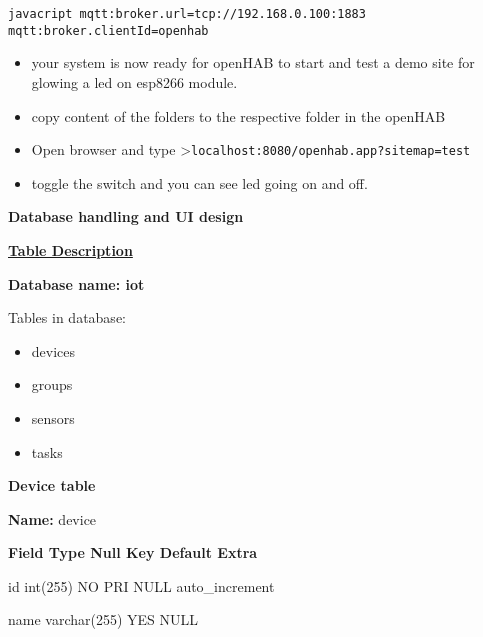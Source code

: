 \documentclass[16pt]{article}
\begin{document}
\texttt{javacript       mqtt:broker.url=tcp://192.168.0.100:1883       mqtt:broker.clientId=openhab}

\begin{itemize}


\item your system is now ready for openHAB to start and test a demo site for
glowing a led on esp8266 module.
\item copy content of the folders to the
respective folder in the openHAB 
\item Open browser and type
\textgreater{}\texttt{localhost:8080/openhab.app?sitemap=test}
\item toggle
the switch and you can see led going on and off.

\end{itemize}

\vspace{8cm}

{\LARGE{\textbf{Database handling and UI design\\}}}

\vspace{0.3cm}
{\Large{\underline{\textbf{Table Description}}}}
\vspace{0.2cm}

\textbf{Database name: iot}

Tables in database: 

\begin{itemize}

\item devices
\item groups 
\item sensors
\item tasks  

\end{itemize}

\textbf{Device table}

\textbf{Name:} device

\textbf{\textbar{} Field \textbar{} Type \textbar{} Null \textbar{} Key
\textbar{} Default \textbar{} Extra \textbar{}}

\textbar{} id \textbar{} int(255) \textbar{} NO \textbar{} PRI
\textbar{} NULL \textbar{} auto\_increment \textbar{}

\textbar{} name \textbar{} varchar(255) \textbar{} YES \textbar{}
\textbar{} NULL \textbar{} \textbar{}
\end{document}
